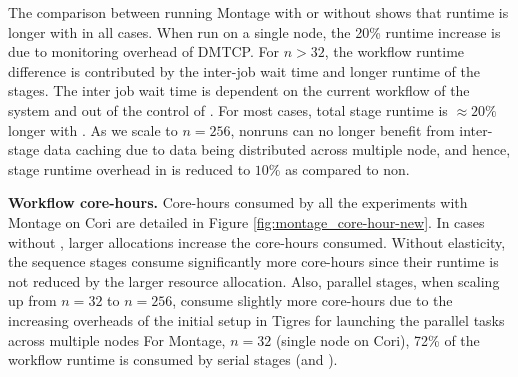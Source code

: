%

The comparison between running Montage with or without \systemname
shows that runtime is longer with \systemname in all cases.
When run on a single node, the 20\% runtime increase is due to
monitoring overhead of DMTCP. For $n>32$, the workflow runtime
difference is contributed by the inter-job wait time and longer runtime of the stages.
The inter job wait time is dependent on the current workflow of the system and out of the
control of \systemname. 
For most cases, total stage runtime is $\approx 20\%$
longer with \systemname. As we scale to $n=256$, non\systemname runs can no longer benefit
from inter-stage data caching due to data being distributed across
multiple node, and hence, stage runtime overhead in \systemname is reduced to $10\%$
as compared to non\systemname. 

\noindent\textbf{Workflow core-hours.}
Core-hours consumed by all the experiments with Montage on
Cori are detailed in Figure \ref{fig:montage_core-hour-new}.
In cases without \systemname, larger allocations
increase the core-hours consumed. Without elasticity, the
sequence stages consume significantly more 
core-hours since their runtime is not reduced by the
larger resource allocation. Also, parallel stages, when
scaling up from $n=32$ to $n=256$, consume
slightly more core-hours due to the increasing overheads
of the initial setup in Tigres for launching the parallel tasks across multiple nodes %
For Montage, $n=32$ (single node on Cori),
72\% of the workflow runtime is consumed by serial stages
(\montageSecond and \montageFourth). 

